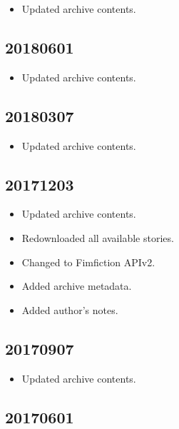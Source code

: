 \documentclass[hidelinks,a4paper,12pt]{article}
\begin{document}
\begin{itemize}
\item Updated archive contents.
\end{itemize}

\subsection{20180601}  \label{sec:changelog_20180601}

\begin{itemize}
\item Updated archive contents.
\end{itemize}

\subsection{20180307}  \label{sec:changelog_20180307}

\begin{itemize}
\item Updated archive contents.
\end{itemize}

\subsection{20171203}  \label{sec:changelog_20171203}

\begin{itemize}
\item Updated archive contents.
\item Redownloaded all available stories.
\item Changed to Fimfiction APIv2.
\item Added archive metadata.
\item Added author's notes.
\end{itemize}

\subsection{20170907}  \label{sec:changelog_20170907}

\begin{itemize}
\item Updated archive contents.
\end{itemize}

\subsection{20170601}  \label{sec:changelog_20170601}
\end{document}
